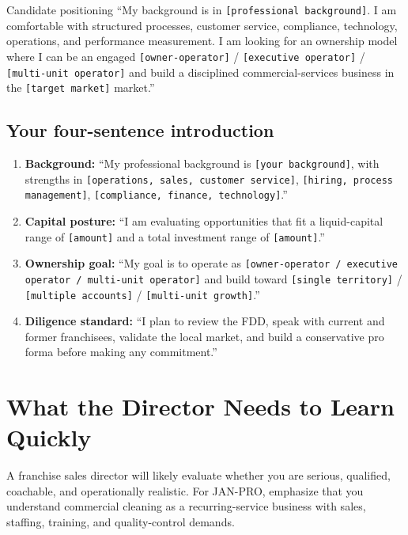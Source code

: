 \documentclass[11pt]{article}
\newcommand{\placeholder}[1]{\textcolor{accent}{\texttt{[#1]}}}
\newcommand{\janpro}{JAN-PRO}
\begin{document}
\begin{scriptbox}{Candidate positioning}
``My background is in \placeholder{professional background}. I am comfortable with structured processes, customer service, compliance, technology, operations, and performance measurement. I am looking for an ownership model where I can be an engaged \placeholder{owner-operator} / \placeholder{executive operator} / \placeholder{multi-unit operator} and build a disciplined commercial-services business in the \placeholder{target market} market.''
\end{scriptbox}

\subsection{Your four-sentence introduction}

\begin{enumerate}
\raggedright
  \item \textbf{Background:} ``My professional background is \placeholder{your background}, with strengths in \placeholder{operations, sales, customer service}, \placeholder{hiring, process management}, \placeholder{compliance, finance, technology}.''
  \item \textbf{Capital posture:} ``I am evaluating opportunities that fit a liquid-capital range of \placeholder{amount} and a total investment range of \placeholder{amount}.''
  \item \textbf{Ownership goal:} ``My goal is to operate as \placeholder{owner-operator / executive operator / multi-unit operator} and build toward \placeholder{single territory} / \placeholder{multiple accounts} / \placeholder{multi-unit growth}.''
  \item \textbf{Diligence standard:} ``I plan to review the FDD, speak with current and former franchisees, validate the local market, and build a conservative pro forma before making any commitment.''
\end{enumerate}

\section{What the Director Needs to Learn Quickly}

A franchise sales director will likely evaluate whether you are serious, qualified, coachable, and operationally realistic. For \janpro{}, emphasize that you understand commercial cleaning as a recurring-service business with sales, staffing, training, and quality-control demands.
\end{document}
